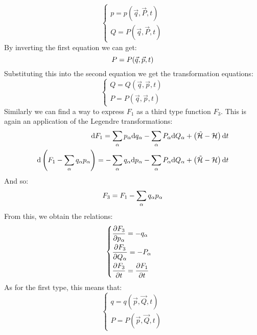 \begin{equation}
    \begin{cases}
        p = p(\vec{q},\vec{P},t)\\
        Q = P(\vec{q},\vec{P},t)
    \end{cases}
\end{equation}
By inverting the first equation we can get:
\begin{equation}
    P = P(\vec{q},\vec{p},t)\\
\end{equation}
Substituting this into the second equation we get the transformation equations:
\begin{equation}
    \begin{cases}
        Q = Q(\vec{q},\vec{p},t)\\
        P = P(\vec{q},\vec{p},t)
    \end{cases}
\end{equation}
Similarly we can find a way to express $F_1$ as a third type function $F_3$. This is again an application of the Legendre transformations:
\begin{equation}
    \begin{split}
        \mathrm{d}F_1 = \displaystyle\sum_{\alpha}p_{\alpha}\mathrm{d}q_{\alpha} - \displaystyle\sum_{\alpha}P_{\alpha}\mathrm{d}Q_{\alpha} + \left(\tilde{\mathcal{H}}- \mathcal{H}\right)\mathrm{d}t\\
    \mathrm{d}\left(F_1 - \displaystyle\sum_{\alpha}q_{\alpha}p_{\alpha}\right) = -\displaystyle\sum_{\alpha}q_{\alpha}\mathrm{d}p_{\alpha} - \displaystyle\sum_{\alpha}P_{\alpha}\mathrm{d}Q_{\alpha} + \left(\tilde{\mathcal{H}}- \mathcal{H}\right)\mathrm{d}t
    \end{split}
\end{equation}
And so:
\begin{equation}
    F_3 = F_1 - \displaystyle\sum_{\alpha}q_{\alpha}p_{\alpha}
\end{equation}
From this, we obtain the relations:
\begin{equation}
    \begin{cases}
        \dfrac{\partial F_3}{\partial p_{\alpha}} = -q_{\alpha}\\[8pt]
        \dfrac{\partial F_3}{\partial Q_{\alpha}} = -P_{\alpha}\\[8pt]
        \dfrac{\partial F_3}{\partial t} = \dfrac{\partial F_1}{\partial t}
    \end{cases}
\end{equation}
As for the first type, this means that:
\begin{equation}
    \begin{cases}
        q = q(\vec{p},\vec{Q},t)\\
        P = P(\vec{p},\vec{Q},t)
    \end{cases}
\end{equation}
